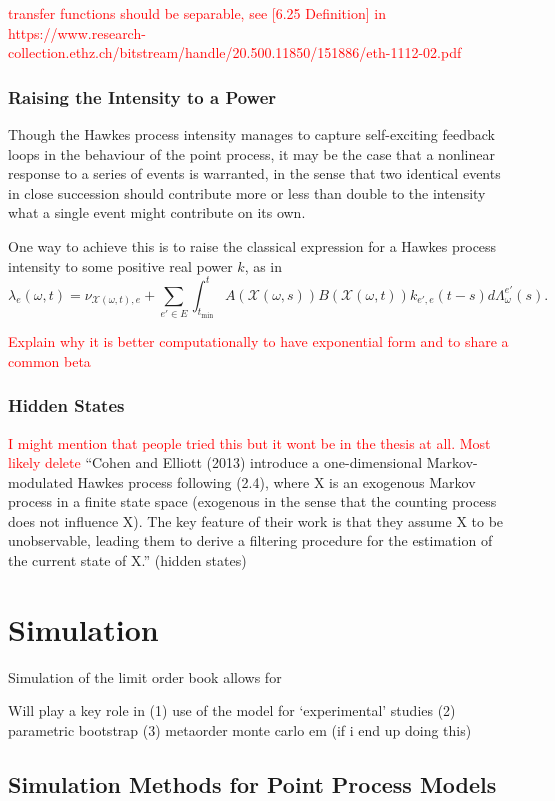 \documentclass[honours,12pt]{unswthesis}
\numberwithin{equation}{section}
\begin{document}
\textcolor{red}{transfer functions should be separable, see [6.25 Definition] in https://www.research-collection.ethz.ch/bitstream/handle/20.500.11850/151886/eth-1112-02.pdf}

\subsection{Raising the Intensity to a Power}
Though the Hawkes process intensity manages to capture self-exciting feedback loops in the behaviour of the point process, it may be the case that a nonlinear response to a series of events is warranted, in the sense that two identical events in close succession should contribute more or less than double to the intensity what a single event might contribute on its own.

One way to achieve this is to raise the classical expression for a Hawkes process intensity to some positive real power $k$, as in
$$\lambda_e(\omega,t) = \nu_{\mathcal{X}(\omega,t),e} + \sum_{e'\in E}\int_{t_\mathrm{min}}^t A(\mathcal{X}(\omega,s))B(\mathcal{X}(\omega,t))k_{e',e}(t-s)d\Lambda_\omega^{e'}(s).$$

\textcolor{red}{Explain why it is better computationally to have exponential form and to share a common beta}
\subsection{Hidden States}
\textcolor{red}{I might mention that people tried this but it wont be in the thesis at all. Most likely delete}
``Cohen and Elliott (2013) introduce a one-dimensional Markov-modulated Hawkes process following (2.4), where X is an exogenous Markov process in a finite state space (exogenous in the sense that the counting process does not influence X).  The key feature of their work is that they assume X to be unobservable, leading them to derive a filtering procedure for the estimation of the current state of X.'' (hidden states)

\chapter{Simulation}
Simulation of the limit order book allows for 

Will play a key role in (1) use of the model for `experimental' studies (2) parametric bootstrap (3) metaorder monte carlo em (if i end up doing this)

\section{Simulation Methods for Point Process Models}
\end{document}
